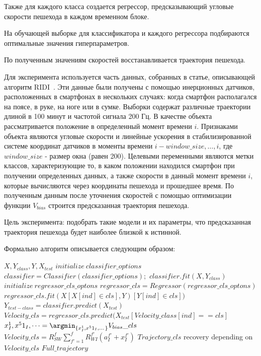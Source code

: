 \documentclass[12pt,twoside]{article}
\begin{document}
Также для каждого класса создается регрессор, предсказывающий угловые скорости пешехода в каждом временном блоке. 

На обучающей выборке для классификатора и каждого регрессора подбираются оптимальные значения гиперпараметров.

По полученным значениям скоростей восстанавливается траектория пешехода.


Для эксперимента используется часть данных, собранных в статье, описывающей алгоритм RIDI~\cite{journals/corr/abs-1712-09004}. Эти данные были получены с помощью инерционных датчиков, расположенных в смартфонах в нескольких случаях: когда смартфон располагался на поясе, в руке, на ноге или в сумке. Выборки содержат различные траектории длиной в 100 минут и частотой сигнала 200 Гц. В качестве объекта рассматривается положение в определенный момент времени $i$. Признаками объекта являются угловые скорости и линейные ускорения в стабилизированной системе координат датчиков в моменты времени $i-window\_size, \dots, i$, где $window\_size$ - размер окна (равен 200). Целевыми переменными являются метки классов, характеризующие то, в каком положении находился смартфон при получении определенных данных, а также скорости в данный момент времени $i$, которые вычисляются через координаты пешехода и прошедшее время. По полученным данным после уточнения скоростей с помощью оптимизации функции  $V_{bias}$ строится предсказанная траектория пешехода.

Цель эксперимента: подобрать такие модели и их параметры, что предсказанная траектория пешехода будет наиболее близкой к истинной.


Формально алгоритм описывается следующим образом: 

\begin{algorithmic}[1]
    \REQUIRE $X, Y_{class}, Y, X_{test}$
    \STATE $initialize ~ classifier\_options$
    \STATE $classifier = Classifier(classifier\_options);$
    \STATE $classifier.fit(X, Y_{class})$
    \STATE $initialize ~ regressor\_cls\_optons$
    \STATE $regressor\_cls = Regressor(regressor\_cls\_optons)$
    \STATE $regressor\_cls.fit(X[X[ind] \in cls], Y)[Y[ind] \in cls])$
    \ENDFOR
    \STATE $Y_{test-class} = classifier.predict(X_{test})$
    \STATE $Velocity\_cls = regressor\_cls.predict(X_{test}
    [Velocity\_class[ind] == cls]$
    \STATE $x^1_I, x^51_I,\dots = \argmin_{\{x^1_I, x^51_I,\dots\}}V_{bias}\_cls$
    \STATE $Velocity\_cls = R_{SW}^f\sum_{f'=1}^f R_{WI}^{f'}(a_I^{f'}+x_I^{f'})$
    \STATE $Trajectory\_cls$ recovery depending on $Velocity\_cls$
    \ENDFOR
    \RETURN $Full\_trajectory$
\end{algorithmic}
\end{document}
